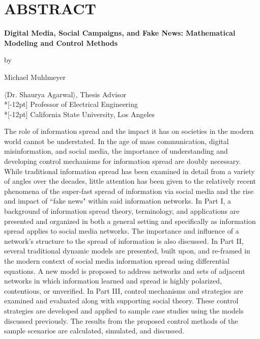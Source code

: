 \chapter*{ABSTRACT}

\begin{center}
\textbf{Digital Media, Social Campaigns, and Fake News: Mathematical Modeling and Control Methods}

by

Michael Muhlmeyer

 $\langle$Dr. Shaurya Agarwal$\rangle$, Thesis Advisor\\*[-12pt]%
 Professor of Electrical Engineering \\*[-12pt]
 California State University, Los Angeles  %

 
 \end{center}

The role of information spread and the impact it has on societies in the modern world cannot be understated. In the age of mass communication, digital misinformation, and social media, the importance of understanding and developing control mechanisms for information spread are doubly necessary. While traditional information spread has been examined in detail from a variety of angles over the decades, little attention has been given to the relatively recent phenomena of the super-fast spread of information via social media and the rise and impact of ``fake news" within said information networks. In Part I, a background of information spread theory, terminology, and applications are presented and organized in both a general setting and specifically as information spread applies to social media networks. The importance and influence of a network's structure to the spread of information is also discussed. In Part II, several traditional dynamic models are presented, built upon, and re-framed in the modern context of social media information spread using differential equations. A new model is proposed to address networks and sets of adjacent networks in which information learned and spread is highly polarized, contentious, or unverified. In Part III, control mechanisms and strategies are examined and evaluated along with supporting social theory. These control strategies are developed and applied to sample case studies using the models discussed previously. The results from the proposed control methods of the sample scenarios are calculated, simulated, and discussed.